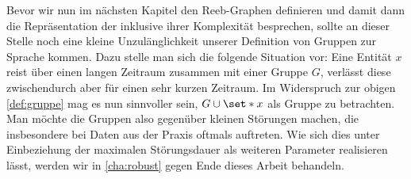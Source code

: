 Bevor wir nun im nächsten Kapitel den Reeb-Graphen definieren und damit dann die Repräsentation der \GrpStruktur inklusive ihrer Komplexität besprechen, sollte an dieser Stelle noch eine kleine Unzulänglichkeit unserer Definition von Gruppen zur Sprache kommen.
Dazu stelle man sich die folgende Situation vor: Eine Entität $x$ reist über einen langen Zeitraum zusammen mit einer Gruppe $G$, verlässt diese zwischendurch aber für einen sehr kurzen Zeitraum.
Im Widerspruch zur obigen \cref{def:gruppe} mag es nun sinnvoller sein, $G \cup \set*{x}$ als Gruppe zu betrachten.
Man möchte die Gruppen also  gegenüber kleinen Störungen machen, die insbesondere bei Daten aus der Praxis oftmals auftreten.
Wie sich dies unter Einbeziehung der maximalen Störungsdauer als weiteren Parameter realisieren lässt, werden wir in \cref{cha:robust} gegen Ende dieses Arbeit behandeln.
